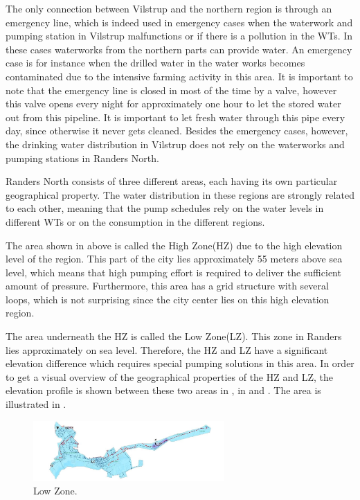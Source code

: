 The only connection between Vilstrup and the northern region is through an emergency line, which is indeed used in emergency cases when the waterwork and pumping station in Vilstrup malfunctions or if there is a pollution in the WTs. In these cases waterworks from the northern parts can provide water. An emergency case is for instance when the drilled water in the water works becomes contaminated due to the intensive farming activity in this area. It is important to note that the emergency line is closed in most of the time by a valve, however this valve opens every night for approximately one hour to let the stored water out from this pipeline. It is important to let fresh water through this pipe every day, since otherwise it never gets cleaned. Besides the emergency cases, however, the drinking water distribution in Vilstrup does not rely on the waterworks and pumping stations in Randers North.  

Randers North consists of three different areas, each having its own particular geographical property. The water distribution in these regions are strongly related to each other, meaning that the pump schedules rely on the water levels in different WTs or on the consumption in the different regions. 

The area shown in  above is called the High Zone(HZ) due to the high elevation level of the region. This part of the city lies approximately 55 meters above sea level, which means that high pumping effort is required to deliver the sufficient amount of pressure. Furthermore, this area has a grid structure with several loops, which is not surprising since the city center lies on this high elevation region.  

The area underneath the HZ is called the Low Zone(LZ). This zone in Randers lies approximately on sea level. Therefore, the HZ and LZ have a significant elevation difference which requires special pumping solutions in this area. In order to get a visual overview of the geographical properties of the HZ and LZ, the elevation profile is shown between these two areas in , in  and . The area is illustrated in .

\begin{figure}[H]
\centering
\includegraphics[width=0.65\textwidth]{report/pictures/Lowzone_region}
\caption{Low Zone.}
\label{fig:lowzone_region}
\end{figure}

